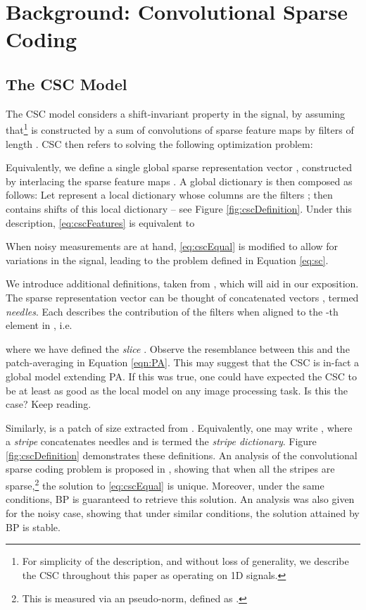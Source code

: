 \documentclass{article}
\begin{document}
\section{Background: Convolutional Sparse Coding}
\label{sec:background}

\subsection{The CSC Model}
\label{sec:csc}

The CSC model considers a shift-invariant property in the signal, by assuming that\footnote{For simplicity of the description, and without loss of generality, we describe the CSC throughout this paper as operating on 1D signals.}  is constructed by a sum of  convolutions of sparse feature maps  by filters  of length . CSC then refers to solving the following optimization problem:

Equivalently, we define a single global sparse representation vector , constructed by interlacing the sparse feature maps . A global dictionary is then composed as follows: Let  represent a local dictionary whose columns are the filters ; then  contains  shifts of this local dictionary -- see Figure \ref{fig:cscDefinition}. Under this description, \eqref{eq:cscFeatures} is equivalent to

When noisy measurements  are at hand, \eqref{eq:cscEqual} is modified to allow for variations in the signal, leading to the problem defined in Equation \eqref{eq:sc}.

We introduce additional definitions, taken from \cite{papyan2017working}, which will aid in our exposition. The sparse representation vector  can be thought of  concatenated vectors , termed \emph{needles}. Each  describes the contribution of the  filters when aligned to the -th element in , i.e.

where we have defined the \emph{slice} . Observe the resemblance between this and the patch-averaging in Equation \eqref{eqn:PA}. This may suggest that the CSC is in-fact a global model extending PA. If this was true, one could have expected the CSC to be at least as good as the local model on any image processing task. Is this the case? Keep reading. 

Similarly,  is a patch of size  extracted from . Equivalently, one may write , where a \emph{stripe}  concatenates  needles and  is termed the \emph{stripe dictionary}. Figure \ref{fig:cscDefinition} demonstrates these definitions.
An analysis of the convolutional sparse coding problem is proposed in \cite{papyan2017working}, showing that when all the stripes  are sparse,\footnote{This is measured via an  pseudo-norm, defined as 
.} the solution to \eqref{eq:cscEqual} is unique. Moreover, under the same conditions, BP is guaranteed to retrieve this solution. An analysis was also given for the noisy case, showing that under similar conditions, the solution attained by BP is stable.
\end{document}
